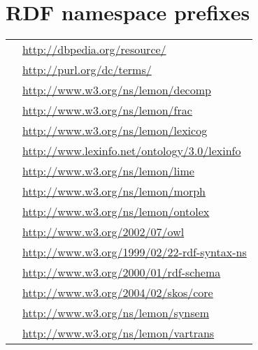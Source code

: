 \documentclass[output=paper,colorlinks,citecolor=brown]{langscibook}
\begin{document}
\section*{RDF namespace prefixes}

\begin{tabularx}{\textwidth}{@{}lQ@{}}
 & \url{http://dbpedia.org/resource/}\\
 & \url{http://purl.org/dc/terms/}\\
 & \url{http://www.w3.org/ns/lemon/decomp}\\
 & \url{http://www.w3.org/ns/lemon/frac}\\
 & \url{http://www.w3.org/ns/lemon/lexicog}\\
 & \url{http://www.lexinfo.net/ontology/3.0/lexinfo}\\
 & \url{http://www.w3.org/ns/lemon/lime}\\
 & \url{http://www.w3.org/ns/lemon/morph}\\
 & \url{http://www.w3.org/ns/lemon/ontolex}\\
 & \url{http://www.w3.org/2002/07/owl}\\
 & \url{http://www.w3.org/1999/02/22-rdf-syntax-ns}\\
 & \url{http://www.w3.org/2000/01/rdf-schema}\\
 & \url{http://www.w3.org/2004/02/skos/core}\\
 & \url{http://www.w3.org/ns/lemon/synsem}\\
 & \url{http://www.w3.org/ns/lemon/vartrans}\\
\end{tabularx}




\printbibliography[heading=subbibliography,notkeyword=this]
\end{document}
